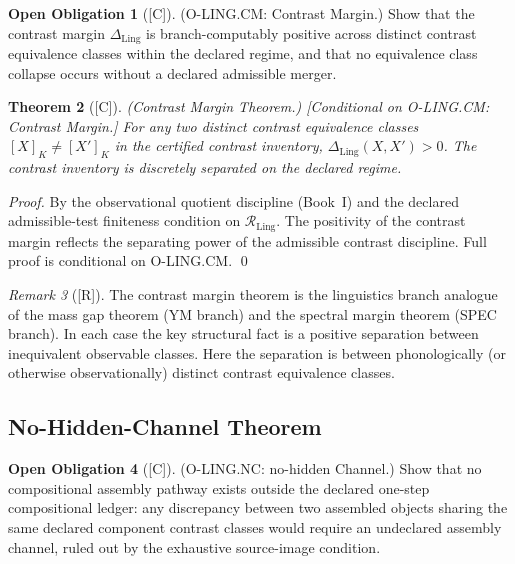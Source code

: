 \documentclass[12pt,oneside]{amsbook}
\theoremstyle{plain}
\newtheorem{theorem}{Theorem}[section]
\theoremstyle{definition}
\newtheorem{obligation}[theorem]{Open Obligation}
\theoremstyle{remark}
\newtheorem{remark}[theorem]{Remark}
\newcommand{\status}[1]{\textup{[#1]}}
\begin{document}
\begin{obligation}[\status{C}]\label{ob:ling-CM}
\textup{(O-LING.CM: Contrast Margin.)}
Show that the contrast margin $\Delta_{\mathrm{Ling}}$ is
branch-computably positive across distinct contrast equivalence classes
within the declared regime, and that no equivalence class collapse
occurs without a declared admissible merger.
\end{obligation}

\begin{theorem}[\status{C}]\label{thm:ling-contrast-margin}
\textup{(Contrast Margin Theorem.)}
\textup{[Conditional on O-LING.CM: Contrast Margin.]}
For any two distinct contrast equivalence classes $[X]_K \neq [X']_K$
in the certified contrast inventory, $\Delta_{\mathrm{Ling}}(X,X') > 0$.
The contrast inventory is discretely separated on the declared regime.
\end{theorem}

\begin{proof}
By the observational quotient discipline (Book~I) and the declared
admissible-test finiteness condition on $\mathcal{R}_{\mathrm{Ling}}$.
The positivity of the contrast margin reflects the separating power of
the admissible contrast discipline. Full proof is conditional on
O-LING.CM.
\qed
\end{proof}

\begin{remark}[\status{R}]\label{rem:ling-gap-analogy}
The contrast margin theorem is the linguistics branch analogue of the
mass gap theorem (YM branch) and the spectral margin theorem (SPEC
branch). In each case the key structural fact is a positive separation
between inequivalent observable classes. Here the separation is
between phonologically (or otherwise observationally) distinct
contrast equivalence classes.
\end{remark}

\subsection{No-Hidden-Channel Theorem}\label{sec:ling-NC}

\begin{obligation}[\status{C}]\label{ob:ling-NC}
\textup{(O-LING.NC: no-hidden Channel.)}
Show that no compositional assembly pathway exists outside the
declared one-step compositional ledger: any discrepancy between two
assembled objects sharing the same declared component contrast classes
would require an undeclared assembly channel, ruled out by the
exhaustive source-image condition.
\end{obligation}
\end{document}
